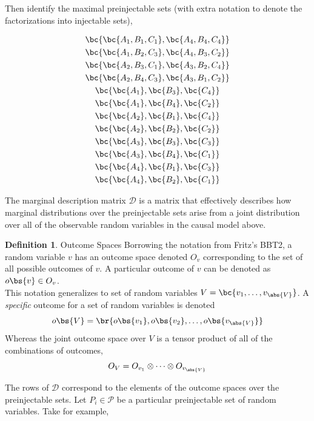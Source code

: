 \documentclass{article}
\theoremstyle{definition}
\newtheorem{definition}{Definition}[section]
\begin{document}
    Then identify the maximal preinjectable sets (with extra notation to denote the factorizations into injectable sets),

    \begin{gather*}
        \bc{\bc{A_1, B_1, C_1}, \bc{A_4, B_4, C_4}} \\
        \bc{\bc{A_1, B_2, C_3}, \bc{A_4, B_3, C_2}} \\
        \bc{\bc{A_2, B_3, C_1}, \bc{A_3, B_2, C_4}} \\
        \bc{\bc{A_2, B_4, C_3}, \bc{A_3, B_1, C_2}} \\
        \bc{\bc{A_1}, \bc{B_3}, \bc{C_4}} \\
        \bc{\bc{A_1}, \bc{B_4}, \bc{C_2}} \\
        \bc{\bc{A_2}, \bc{B_1}, \bc{C_4}} \\
        \bc{\bc{A_2}, \bc{B_2}, \bc{C_2}} \\
        \bc{\bc{A_3}, \bc{B_3}, \bc{C_3}} \\
        \bc{\bc{A_3}, \bc{B_4}, \bc{C_1}} \\
        \bc{\bc{A_4}, \bc{B_1}, \bc{C_3}} \\
        \bc{\bc{A_4}, \bc{B_2}, \bc{C_1}}
    \end{gather*}

    The marginal description matrix $\mathcal{D}$ is a matrix that effectively describes how marginal distributions over the preinjectable sets arise from a joint distribution over all of the observable random variables in the causal model above.

    \begin{definition}{Outcome Spaces}
    Borrowing the notation from Fritz's BBT2, a random variable $v$ has an outcome space denoted $O_v$ corresponding to the set of all possible outcomes of $v$. A particular outcome of $v$ can be denoted as $o\bs{v} \in O_v$. \\

    This notation generalizes to set of random variables $V = \bc{v_1, \ldots, v_{\abs{V}}}$. A \textit{specific} outcome for a set of random variables is denoted
    \[ o\bs{V} = \br{o\bs{v_1}, o\bs{v_2}, \ldots, o\bs{v_{\abs{V}}} } \]
    Whereas the joint outcome space over $V$ is a tensor product of all of the combinations of outcomes,
    \[ O_V = O_{v_1} \otimes \cdots \otimes O_{v_{\abs{V}}} \]
    \end{definition}

    The rows of $\mathcal{D}$ correspond to the elements of the outcome spaces over the preinjectable sets. Let $P_i \in \mathcal{P}$ be a particular preinjectable set of random variables. Take for example,
\end{document}
